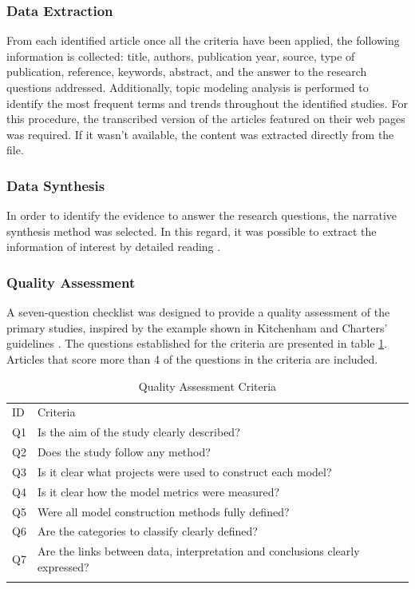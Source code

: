 \documentclass[conference]{IEEEtran}
\begin{document}
\subsubsection{Data Extraction}

From each identified article once all the criteria have been applied, the following information is collected: title, authors, publication year, source, type of publication, reference, keywords, abstract, and the answer to the research questions addressed.
Additionally, topic modeling analysis is performed to identify the most frequent terms and trends throughout the identified studies. For this procedure, the transcribed version of the articles featured on their web pages was required. If it wasn't available, the content was extracted directly from the file.

\subsubsection{Data Synthesis}

In order to identify the evidence to answer the research questions, the narrative synthesis method was selected. In this regard, it was possible to extract the information of interest by detailed reading \cite{10.1177/1356389008097871}.

\subsubsection{Quality Assessment}

A seven-question checklist was designed to provide a quality assessment of the primary studies, inspired by the example shown in Kitchenham and Charters’ guidelines \cite{Kitchenham2007}. The questions established for the criteria are presented in table \ref{tab:quality}. Articles that score more than 4 of the questions in the criteria are included.

\begin{table}[!htbp]
\caption{Quality Assessment Criteria}
\label{tab:quality}       %
\begin{tabular}{p{0.2cm}p{7.8cm}}
\hline\noalign{\smallskip}
ID & Criteria \\
\noalign{\smallskip}\hline\noalign{\smallskip}
Q1 & Is the aim of the study clearly described? \\
Q2 & Does the study follow any method? \\
Q3 & Is it clear what projects were used to construct each model? \\
Q4 & Is it clear how the model metrics were measured? \\
Q5 & Were all model construction methods fully defined? \\
Q6 & Are the categories to classify clearly defined? \\
Q7 & Are the links between data, interpretation and conclusions clearly expressed? \\
\noalign{\smallskip}\hline
\end{tabular}
\end{table}
\end{document}
